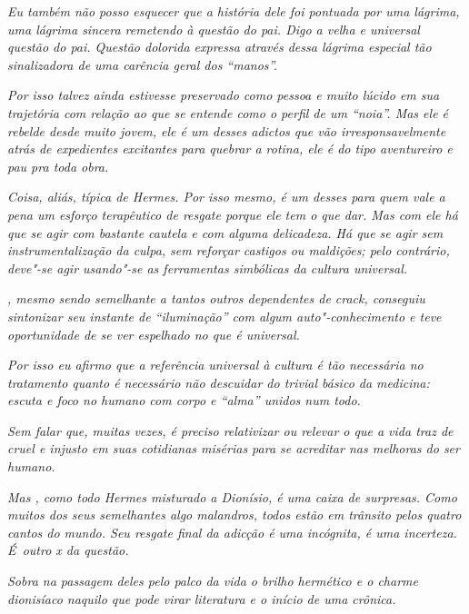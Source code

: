 \emph{Eu também não posso esquecer que a história dele foi pontuada por
uma lágrima, uma lágrima sincera remetendo à questão do pai. Digo a velha
e universal questão do pai. Questão dolorida expressa através dessa
lágrima especial tão sinalizadora de uma carência geral dos ``manos''.}~

\emph{Por isso  talvez ainda estivesse preservado como pessoa e muito
lúcido em sua trajetória com relação ao que se entende como o perfil de
um ``noia''. Mas ele é rebelde desde muito jovem, ele é um desses
adictos que vão irresponsavelmente atrás de expedientes excitantes para
quebrar a rotina, ele é do tipo aventureiro e pau pra toda obra.}~

\emph{Coisa, aliás, típica de Hermes. Por isso mesmo,  é um desses
para quem vale a pena um esforço terapêutico de resgate porque ele tem o
que dar. Mas com ele há que se agir com bastante cautela e com alguma
delicadeza. Há que se agir sem instrumentalização da culpa, sem reforçar
castigos ou maldições; pelo contrário, deve"-se agir usando"-se as
ferramentas simbólicas da cultura universal.}~

\emph{, mesmo sendo semelhante a tantos outros dependentes de crack,
conseguiu sintonizar seu instante de ``iluminação'' com algum
auto"-conhecimento e teve oportunidade de se ver espelhado no que é
universal.}~

\emph{Por isso eu afirmo que a referência universal à cultura é tão
necessária no tratamento quanto é necessário não descuidar do trivial
básico da medicina: escuta e foco no humano com corpo e ``alma'' unidos
num todo.}~

\emph{Sem falar que, muitas vezes, é preciso relativizar ou relevar o
que a vida traz de cruel e injusto em suas cotidianas misérias para se
acreditar nas melhoras do ser humano.}~

\emph{Mas , como todo Hermes misturado a Dionísio, é uma caixa de
surpresas. Como muitos dos seus semelhantes algo malandros, todos estão
em trânsito pelos quatro cantos do mundo. Seu resgate final da adicção é
uma incógnita, é uma incerteza. É~outro x da questão.}~

\emph{Sobra na passagem deles pelo palco da vida o brilho hermético e o
charme dionisíaco naquilo que pode virar literatura e o início de uma
crônica.~}
\endgroup